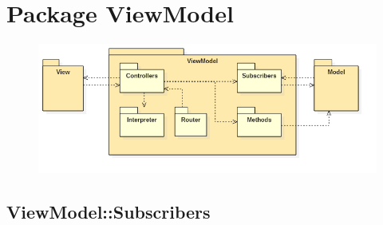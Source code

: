 \section{Package ViewModel}
\begin{figure}[h!]
\begin{center}
	\includegraphics[scale=0.7]{../images/ViewModelPackage.png}
\end{center}
\end{figure}

\subsection{ViewModel::Subscribers}
